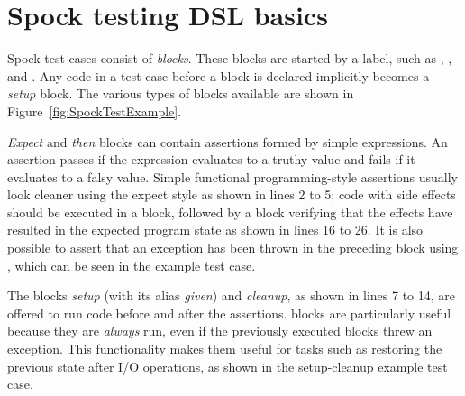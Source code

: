 \section{Spock testing DSL basics}
Spock test cases consist of \textit{blocks}.
These blocks are started by a label,
such as , , and .
Any code in a test case before a block is declared
implicitly becomes a \textit{setup} block.
\autocite[Chapter: Spock Primer - Feature Methods - Blocks]{SpockFrameworkDoc}
The various types of blocks available
are shown in Figure~\ref{fig:SpockTestExample}.

\textit{Expect} and \textit{then} blocks
can contain assertions formed by simple expressions.
An assertion passes if the expression evaluates to a truthy value
and fails if it evaluates to a falsy value.
Simple functional programming-style assertions
usually look cleaner using the expect style
as shown in lines 2 to 5;
code with side effects should be executed in a  block,
followed by a  block verifying that
the effects have resulted in the expected program state
as shown in lines 16 to 26.
It is also possible to assert that an exception
has been thrown in the preceding  block using ,
which can be seen in the  example test case.

The blocks \textit{setup} (with its alias \textit{given}) and \textit{cleanup},
as shown in lines 7 to 14,
are offered to run code before and after the assertions.
 blocks are particularly useful because they are \textit{always} run,
even if the previously executed blocks threw an exception.
\autocite[Chapter: Spock Primer - Feature Methods - Blocks]{SpockFrameworkDoc}
This functionality makes them useful for tasks
such as restoring the previous state after I/O operations,
as shown in the setup-cleanup example test case.
